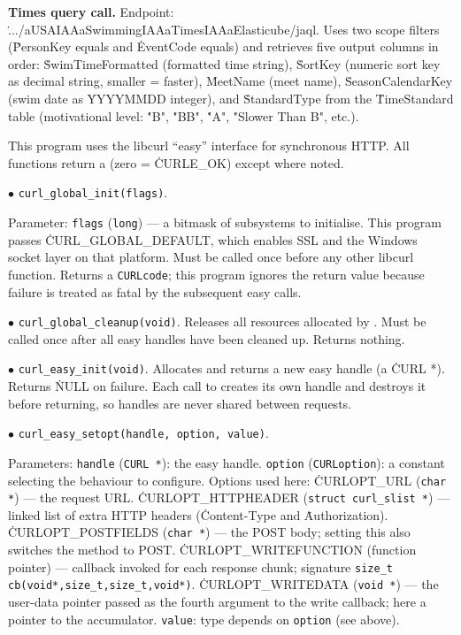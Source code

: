 \medskip\noindent
{\bf Times query call.}
Endpoint: \.{.../aUSAIAAaSwimmingIAAaTimesIAAaElasticube/jaql}.
Uses two scope filters (\.{PersonKey} equals and \.{EventCode} equals)
and retrieves five output columns in order:
\.{SwimTimeFormatted} (formatted time string),
\.{SortKey} (numeric sort key as decimal string, smaller = faster),
\.{MeetName} (meet name),
\.{SeasonCalendarKey} (swim date as \.{YYYYMMDD} integer), and
\.{StandardType} from the \.{TimeStandard} table
(motivational level: \.{"B"}, \.{"BB"}, \.{"A"}, \.{"Slower Than B"}, etc.).

\fi

This program uses the libcurl ``easy'' interface for synchronous HTTP.
All functions return a  (zero = \.{CURLE\_OK}) except where
noted.

\medskip
\item{$\bullet$} {\tt curl\_global\_init(flags)}.
\par\noindent Parameter: {\tt flags} ({\tt long}) ---
a bitmask of subsystems to initialise.
This program passes \.{CURL\_GLOBAL\_DEFAULT}, which enables SSL
and the Windows socket layer on that platform.
Must be called once before any other libcurl function.
Returns a {\tt CURLcode}; this program ignores the return value
because failure is treated as fatal by the subsequent easy calls.

\item{$\bullet$} {\tt curl\_global\_cleanup(void)}.
Releases all resources allocated by .
Must be called once after all easy handles have been cleaned up.
Returns nothing.

\item{$\bullet$} {\tt curl\_easy\_init(void)}.
Allocates and returns a new easy handle (a \.{CURL *}).
Returns \.{NULL} on failure.
Each call to  creates its own handle and destroys it
before returning, so handles are never shared between requests.

\item{$\bullet$} {\tt curl\_easy\_setopt(handle, option, value)}.
\par\noindent Parameters:
\itemitem{--} {\tt handle} ({\tt CURL *}): the easy handle.
\itemitem{--} {\tt option} ({\tt CURLoption}): a constant selecting
the behaviour to configure.  Options used here:
\itemitem{} \.{CURLOPT\_URL} ({\tt char *}) --- the request URL.
\itemitem{} \.{CURLOPT\_HTTPHEADER} ({\tt struct curl\_slist *}) ---
linked list of extra HTTP headers
(\.{Content-Type} and \.{Authorization}).
\itemitem{} \.{CURLOPT\_POSTFIELDS} ({\tt char *}) ---
the POST body; setting this also switches the method to POST.
\itemitem{} \.{CURLOPT\_WRITEFUNCTION} (function pointer) ---
callback invoked for each response chunk; signature
{\tt size\_t cb(void*,size\_t,size\_t,void*)}.
\itemitem{} \.{CURLOPT\_WRITEDATA} ({\tt void *}) ---
the user-data pointer passed as the fourth argument to the
write callback; here a pointer to the  accumulator.
\itemitem{--} {\tt value}: type depends on {\tt option} (see above).

